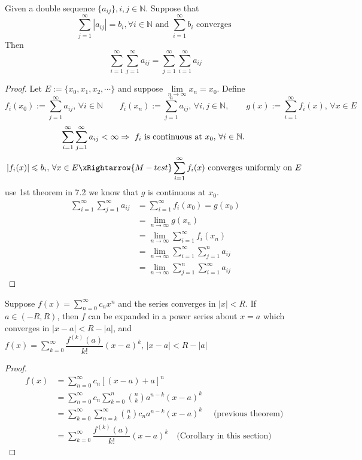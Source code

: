 \begin{theorem}
    Given a double sequence  $ \{a_{ij}\}, i,j\in \mathbb{N} $. Suppose that 
    \begin{equation*}
        \sum\limits_{j=1}^{\infty}|a_{ij}|=b_i,\forall i\in\mathbb{N } \text{ and } \sum\limits_{i=1}^{\infty} b_i \text{ converges } 
    \end{equation*}
    Then \[\sum\limits_{i=1}^{\infty} \sum\limits_{j=1}^{\infty} a_{ij }=\sum\limits_{j=1}^{\infty} \sum\limits_{i=1}^{\infty} a_{ij}\] 
\end{theorem}
\begin{proof}
    Let $ E:=\{x_0,x_1,x_2,\cdots\} $ and suppose  $ \lim\limits_{n\to\infty}x_n=x_0   $. Define
     \[ f_i(x_0):=\sum\limits_{j=1}^{\infty} a_{ij},\,\forall i\in\mathbb{N }\qquad f_i(x_n):=\sum\limits_{j=1}^{n}a_{ij},\,\forall i,j\in\mathbb{N },\qquad g(x):=\sum\limits_{i=1}^{\infty} f_i(x),\,\forall x\in E  \] 
     \[\sum\limits_{i=1}^{\infty} \sum\limits_{j=1}^{\infty} a_{ij }<\infty\Rightarrow \text{ $ f_i  $ is continuous at  $ x_0,\,\forall i\in\mathbb{N} $. }\]
    \[|f_i(x) |\leqslant b_i,\,\forall x\in E \xRightarrow{M-test} \sum\limits_{i=1}^{\infty}f_i(x) \text{ converges uniformly on  $ E $ } \]
    use 1st theorem in 7.2 we know that  $ g  $ is continuous at  $ x_0 $.
    \begin{align*}
        \sum\limits_{i=1}^{\infty} \sum\limits_{j=1}^{\infty} a_{ij }&=\sum\limits_{i=1}^{\infty}f_i(x_0)=g(x_0)\\
        &=\lim\limits_{n\to\infty}g(x_n)\\
        &=\lim\limits_{n\to\infty}\sum\limits_{i=1}^{\infty} f_i(x_n)     \\
        &=\lim\limits_{n\to\infty}\sum\limits_{i=1}^{\infty} \sum\limits_{j=1}^{n } a_{ij}\\
        &=\lim\limits_{n\to\infty} \sum\limits_{j=1}^{n } \sum\limits_{i=1}^{\infty} a_{ij}   
    \end{align*} 
\end{proof}
\begin{theorem}
    Suppose  $ f(x)=\sum\limits_{n=0}^{\infty} c_nx^n $ and the series converges in  $ |x|<R $. If  $ a\in(-R,R) $, then  $ f $ can be expanded in a power series about  $ x=a $ which converges in  $ |x-a|<R-|a| $, and  $ f(x)=\sum\limits_{k=0}^{\infty} \dfrac{f^{(k)}(a )}{k!}(x-a)^k,\,|x-a|<R-|a| $     
\end{theorem}
\begin{proof}
    \begin{align*}
        f(x)&=\sum\limits_{n=0}^{\infty} c_n[(x-a)+a]^n\\
        &=\sum\limits_{n=0}^{\infty} c_n \sum\limits_{k=0}^{ n }\binom{n}{k} a^{n-k}(x-a)^k\\
        &=\sum\limits_{k=0}^{\infty} \sum\limits_{n=k }^{\infty} \binom{n }{k }c_n a^{n-k}(x-a)^k\quad\text{ (previous theorem) }\\
        &=\sum\limits_{k=0}^{\infty} \dfrac{f^{(k)}(a)}{k!}(x-a)^k\quad\text{(Corollary in this section)}
    \end{align*}
\end{proof}
